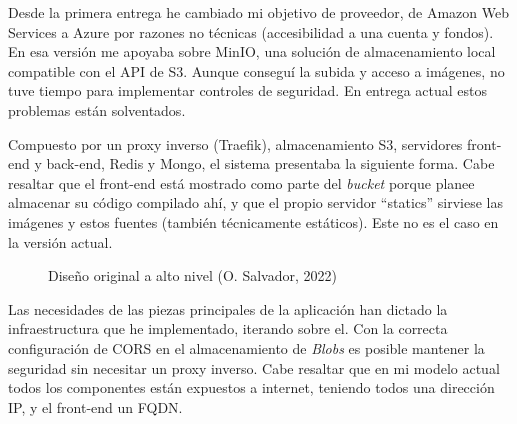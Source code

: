 \documentclass[11pt]{article}
\begin{document}
\begin{flushleft}
Desde la primera entrega he cambiado mi objetivo de proveedor, de Amazon Web Services a Azure por razones no técnicas (accesibilidad a una cuenta y fondos). En esa versión me apoyaba sobre MinIO, una solución de almacenamiento local compatible con el API de S3. Aunque conseguí la subida y acceso a imágenes, no tuve tiempo para implementar controles de seguridad. En entrega actual estos problemas están solventados.
\linebreak



\clearpage
Compuesto por un proxy inverso (Traefik), almacenamiento S3, servidores front-end y back-end, Redis y Mongo, el sistema presentaba la siguiente forma. Cabe resaltar que el front-end está mostrado como parte del \textit{bucket} porque planee almacenar su código compilado ahí, y que el propio servidor  ``statics'' sirviese las imágenes y estos fuentes (también técnicamente estáticos). Este no es el caso en la versión actual.

	\begin{figure}[htb]
		\centering
		\caption{Diseño original a alto nivel (O. Salvador, 2022)}
	\end{figure}

Las necesidades de las piezas principales de la aplicación han dictado la infraestructura que he implementado, iterando sobre el. Con la correcta configuración de CORS en el almacenamiento de \textit{Blobs} es posible mantener la seguridad sin necesitar un proxy inverso. Cabe resaltar que en mi modelo actual todos los componentes están expuestos a internet, teniendo todos una dirección IP, y el front-end un FQDN.
\linebreak


\end{flushleft}
\end{document}
